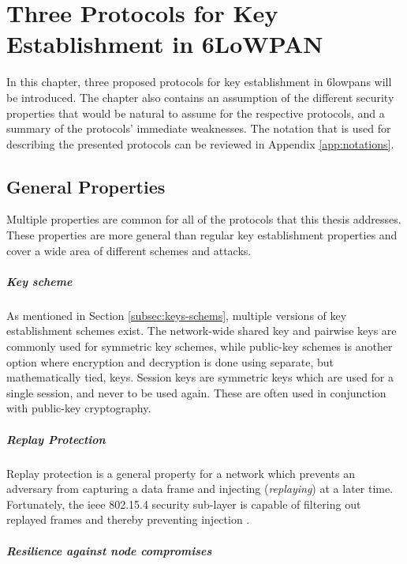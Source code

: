 \chapter{Three Protocols for Key Establishment in 6LoWPAN}
\label{chp:protocols}

In this chapter, three proposed protocols for key establishment in \gls{6lowpan}s will be introduced. The chapter also contains an assumption of the different security properties that would be natural to assume for the respective protocols, and a summary of the protocols' immediate weaknesses. The notation that is used for describing the presented protocols can be reviewed in Appendix \ref{app:notations}.


\section{General Properties}

Multiple properties are common for all of the protocols that this thesis addresses. These properties are more general than regular key establishment properties and cover a wide area of different schemes and attacks.

\paragraph{Key scheme} As mentioned in Section \ref{subsec:keys-schems}, multiple versions of key establishment schemes exist. The network-wide shared key and pairwise keys are commonly used for symmetric key schemes, while public-key schemes is another option where encryption and decryption is done using separate, but mathematically tied, keys. Session keys are symmetric keys which are used for a single session, and never to be used again. These are often used in conjunction with public-key cryptography.

\paragraph{Replay Protection} Replay protection is a general property for a network which prevents an adversary from capturing a data frame and injecting (\emph{replaying}) at a later time. Fortunately, the \gls{ieee} 802.15.4 security sub-layer is capable of filtering out replayed frames and thereby preventing injection \cite{krentz20136lowpan}.

\paragraph{Resilience against node compromises}

